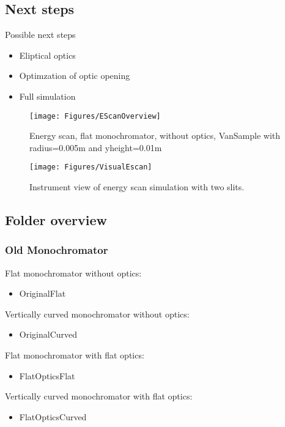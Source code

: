 \subsection{Next steps}
Possible next steps
\begin{itemize}
\item Eliptical optics
\item Optimzation of optic opening
\item Full simulation
\end{itemize}
\newpage
\begin{figure}[H]\centering
\texttt{[image: Figures/EScanOverview]}
\caption{Energy scan, flat monochromator, without optics, VanSample with radius=0.005m and yheight=0.01m}
\end{figure}
\begin{figure}[H]\centering
\texttt{[image: Figures/VisualEscan]}
\caption{Instrument view of energy scan simulation with two slits.}
\end{figure}
\newpage
\subsection{Folder overview}
\subsubsection{Old Monochromator}
Flat monochromator without optics:
\begin{itemize}
\item OriginalFlat
\end{itemize}
Vertically curved monochromator without optics:
\begin{itemize}
\item OriginalCurved
\end{itemize}
Flat monochromator with flat optics:
\begin{itemize}
\item FlatOpticsFlat
\end{itemize}
Vertically curved monochromator with flat optics:
\begin{itemize}
\item FlatOpticsCurved
\end{itemize}
